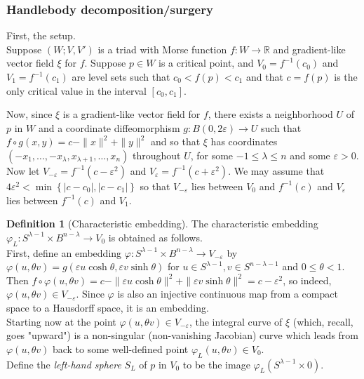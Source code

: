 \documentclass[reqno]{amsart}
\theoremstyle{definition}
\newtheorem{definition}[theorem]{Definition}
\theoremstyle{remark}
\begin{document}
\subsubsection{Handlebody decomposition/surgery}


First, the setup.\\
Suppose $\left( W; V,V' \right) $ is a triad with
Morse function $f \colon W \to \mathbb{R}$ and
gradient-like vector field $\xi$ for $f$.
Suppose $p \in W$ is a critical point, and
$V_0 = f^{-1}(c_0)$ and
$V_1 = f^{-1}(c_1)$ are level sets such that
$c_0 < f(p) < c_1$ and that
$c = f(p)$ is the only critical value in the interval
$\left[ c_0,c_1 \right] $.

Now, since $\xi$ is a gradient-like vector field for
$f$, there exists a neighborhood $U$ of $p$ in $W$
and a coordinate diffeomorphism
$ g \colon B(0, 2 \varepsilon) \to U$ such that
$f \circ g  (x,y) = 
c - \|x\|^2 + \|y\|^2 $ and
so that $\xi$ has coordinates
$\left( -x_1, \ldots, -x_{\lambda},
x_{\lambda+1}, \ldots, x_n\right) $ throughout $U$, for
some $-1 \le \lambda \le n$ and some
$\varepsilon > 0$.\\
Now let $V_{-\varepsilon} =
f^{-1}\left( c- \varepsilon^2 \right) $ and
$V_{\varepsilon} = f^{-1}\left( c+ \varepsilon^2 \right) $.
We may assume that
$4 \varepsilon^2 < \min \left\{ \left| c-c_0 \right| ,
\left| c-c_1 \right| \right\} $ so that
$V_{-\varepsilon}$ lies between
$V_0$ and $f^{-1}(c)$ and
$V_{\varepsilon}$ lies between $f^{-1}(c) $ and
$V_1$.

\begin{definition}[Characteristic embedding]
    The characteristic embedding
    $\varphi_{L} \colon S^{\lambda-1} \times 
    B^{n - \lambda} \to V_0$ is obtained as follows.\\
    First, define an embedding
    $\varphi \colon S^{\lambda-1} \times 
    B^{n-\lambda} \to V_{-\varepsilon}$ by
    $\varphi \left( u, \theta v \right) =
    g \left( \varepsilon u \cosh \theta,
    \varepsilon v \sinh \theta \right) $ for
    $u \in S^{\lambda-1}, v \in S^{n-\lambda-1}$ and
    $0 \le \theta < 1$.
    Then
    $f \circ \varphi \left( u , \theta v \right) 
    = c - \|\varepsilon u \cosh \theta\|^2
    + \| \varepsilon v \sinh \theta \|^2
    = c - \varepsilon^2 $, so indeed,
    $\varphi \left( u, \theta v \right) \in 
    V_{-\varepsilon}$.
    Since $\varphi $ is also an injective
    continuous map from a compact space to a Hausdorff space,
    it is an embedding.\\
    Starting now at the point
    $\varphi \left( u, \theta v \right) \in V_{- \varepsilon}$,
    the integral curve of $\xi$ (which, recall, goes
    "upward") is a non-singular (non-vanishing
    Jacobian) curve which leads
    from $\varphi \left( u, \theta v \right) $ back to
    some well-defined point $\varphi_L \left( u,
    \theta v\right)  \in V_0$.\\
    Define the \textit{left-hand sphere} $S_L$ of
    $p$ in $V_0$ to be the image
    $\varphi_L \left( S^{\lambda-1} \times 0 \right) $.
\end{definition}
\end{document}
